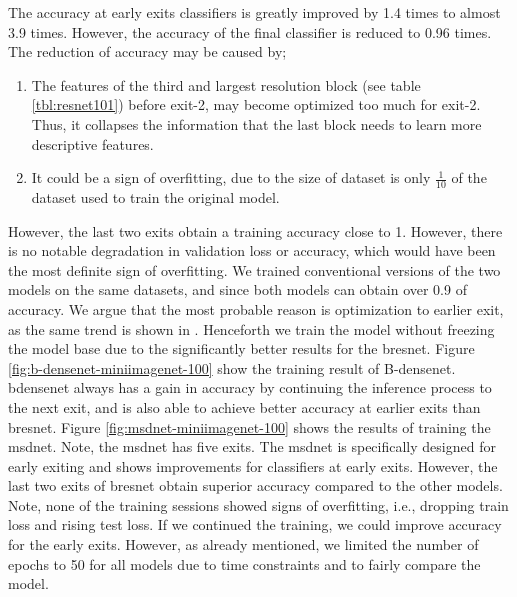 The accuracy at early exits classifiers is greatly improved by 1.4 times to almost 3.9 times. However, the accuracy of the final classifier is reduced to 0.96 times. The reduction of accuracy may be caused by;
\begin{enumerate}
	\item The features of the third and largest resolution block (see table \ref{tbl:resnet101}) before exit-2, may become optimized too much for exit-2. Thus, it collapses the information that the last block needs to learn more descriptive features. 
	\item It could be a sign of overfitting, due to the size of dataset is only $\frac{1}{10}$ of the dataset used to train the original model. 
\end{enumerate}
However, the last two exits obtain a training accuracy close to 1. However, there is no notable degradation in validation loss or accuracy, which would have been the most definite sign of overfitting. We trained conventional versions of the two models on the same datasets, and since both models can obtain over 0.9 of accuracy. We argue that the most probable reason is optimization to earlier exit, as the same trend is shown in \cite{huang_multi-scale_2017}.
Henceforth we train the model without freezing the model base due to the significantly better results for the \gls{bresnet}. Figure \ref{fig:b-densenet-miniimagenet-100} show the training result of B-\gls{densenet}. \gls{bdensenet} always has a gain in accuracy by continuing the inference process to the next exit, and is also able to achieve better accuracy at earlier exits than \gls{bresnet}. Figure \ref{fig:msdnet-miniimagenet-100} shows the results of training the \gls{msdnet}. Note, the \gls{msdnet} has five exits. The \gls{msdnet} is specifically designed for early exiting and shows improvements for classifiers at early exits. However, the last two exits of \gls{bresnet} obtain superior accuracy compared to the other models. 
Note, none of the training sessions showed signs of overfitting, i.e., dropping train loss and rising test loss. If we continued the training, we could improve accuracy for the early exits. However, as already mentioned, we limited the number of epochs to 50 for all models due to time constraints and to fairly compare the model.
